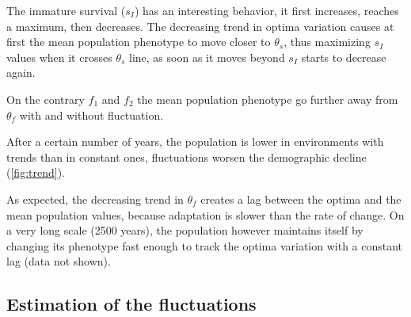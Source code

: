 The immature survival ($s_I$) has an interesting behavior, it first increases, reaches a maximum, then decreases. The decreasing trend in optima variation causes at first the mean population phenotype to move closer to $\theta_s$, thus maximizing $s_I$ values when it crosses $\theta_s$ line, as soon as it moves beyond $s_I$ starts to decrease again.

On the contrary $f_1$ and $f_2$ the mean population phenotype go further away from $\theta_f$ with and without fluctuation.

After a certain number of years, the population is lower in environments with trends than in constant ones, fluctuations worsen the demographic decline (\autoref{fig:trend}). 

As expected, the decreasing trend in $\theta_f$ creates a lag between the optima and the mean population values, because adaptation is slower than the rate of change. On a very long scale (2500 years), the population however maintains itself by changing its phenotype fast enough to track the optima variation with a constant lag (data not shown).

\clearpage

\subsection*{Estimation of the fluctuations}


